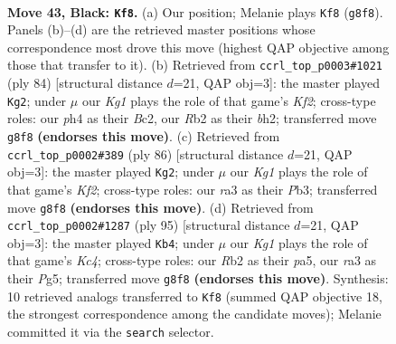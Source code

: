 \documentclass[11pt]{article}
\begin{document}
\clearpage

\begin{figure}[p]\centering
\begin{subfigure}{0.46\textwidth}\centering
\resizebox{\linewidth}{!}{%
\newchessgame
\chessboard[
  setfen={b5k1/P4p2/7K/4PN2/5p1P/R7/1r6/8 b - - 2 43},
  showmover=false,
  pgfstyle=straightmove, color=movearrow, markmove={g8-f8}
]}
\caption{}
\end{subfigure}\hfill
\begin{subfigure}{0.46\textwidth}\centering
\resizebox{\linewidth}{!}{%
\newchessgame
\chessboard[
  setfen={8/1p1k4/8/1NnP3p/8/8/P1B2K1b/8 w - - 0 43},
  showmover=false,
  pgfstyle=straightmove, color=movearrow, markmove={f2-g2}
]}
\caption{}
\end{subfigure}
\\[4pt]
\begin{subfigure}{0.46\textwidth}\centering
\resizebox{\linewidth}{!}{%
\newchessgame
\chessboard[
  setfen={8/4k3/1pB4p/5n2/3P4/1P6/P4K1p/8 w - - 4 44},
  showmover=false,
  pgfstyle=straightmove, color=movearrow, markmove={f2-g2}
]}
\caption{}
\end{subfigure}\hfill
\begin{subfigure}{0.46\textwidth}\centering
\resizebox{\linewidth}{!}{%
\newchessgame
\chessboard[
  setfen={8/8/p7/P1k3pb/8/6P1/2PK4/5N2 b - - 0 48},
  showmover=false,
  pgfstyle=straightmove, color=movearrow, markmove={c5-b4}
]}
\caption{}
\end{subfigure}
\caption{\textbf{Move 43, Black: \texttt{Kf8}.} (a) Our position; Melanie plays \texttt{Kf8} (\texttt{g8f8}). Panels (b)--(d) are the retrieved master positions whose correspondence most drove this move (highest QAP objective among those that transfer to it). (b) Retrieved from \texttt{ccrl\_top\_p0003\#1021} (ply 84) [structural distance $d$=21, QAP obj=3]: the master played \texttt{Kg2}; under $\mu$ our \emph{Kg1} plays the role of that game's \emph{Kf2}; cross-type roles: our \emph{p}h4 as their \emph{B}c2, our \emph{R}b2 as their \emph{b}h2; transferred move \texttt{g8f8} \textbf{(endorses this move)}. (c) Retrieved from \texttt{ccrl\_top\_p0002\#389} (ply 86) [structural distance $d$=21, QAP obj=3]: the master played \texttt{Kg2}; under $\mu$ our \emph{Kg1} plays the role of that game's \emph{Kf2}; cross-type roles: our \emph{r}a3 as their \emph{P}b3; transferred move \texttt{g8f8} \textbf{(endorses this move)}. (d) Retrieved from \texttt{ccrl\_top\_p0002\#1287} (ply 95) [structural distance $d$=21, QAP obj=3]: the master played \texttt{Kb4}; under $\mu$ our \emph{Kg1} plays the role of that game's \emph{Kc4}; cross-type roles: our \emph{R}b2 as their \emph{p}a5, our \emph{r}a3 as their \emph{P}g5; transferred move \texttt{g8f8} \textbf{(endorses this move)}. Synthesis: 10 retrieved analogs transferred to \texttt{Kf8} (summed QAP objective 18, the strongest correspondence among the candidate moves); Melanie committed it via the \texttt{search} selector.}
\label{fig:thought-m85}
\end{figure}
\end{document}
